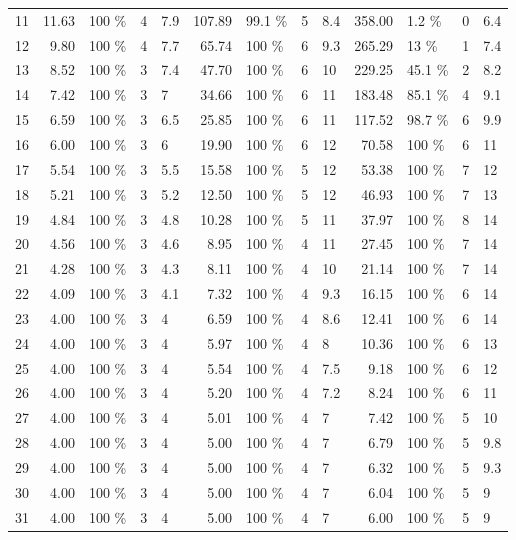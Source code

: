 \begin{tabular}{c|rlll|rlll|rlll}
    11 & 11.63 	&100  \% &     4 &   7.9 &107.89 	&99.1 \% &     5 &   8.4 &358.00 	&1.2  \% &     0 &   6.4\\
    12 &  9.80 	&100  \% &     4 &   7.7 & 65.74 	&100  \% &     6 &   9.3 &265.29 	&13   \% &     1 &   7.4\\
    13 &  8.52 	&100  \% &     3 &   7.4 & 47.70 	&100  \% &     6 &    10 &229.25 	&45.1 \% &     2 &   8.2\\
    14 &  7.42 	&100  \% &     3 &     7 & 34.66 	&100  \% &     6 &    11 &183.48 	&85.1 \% &     4 &   9.1\\
    15 &  6.59 	&100  \% &     3 &   6.5 & 25.85 	&100  \% &     6 &    11 &117.52 	&98.7 \% &     6 &   9.9\\
    16 &  6.00 	&100  \% &     3 &     6 & 19.90 	&100  \% &     6 &    12 & 70.58 	&100  \% &     6 &    11\\
    17 &  5.54 	&100  \% &     3 &   5.5 & 15.58 	&100  \% &     5 &    12 & 53.38 	&100  \% &     7 &    12\\
    18 &  5.21 	&100  \% &     3 &   5.2 & 12.50 	&100  \% &     5 &    12 & 46.93 	&100  \% &     7 &    13\\
    19 &  4.84 	&100  \% &     3 &   4.8 & 10.28 	&100  \% &     5 &    11 & 37.97 	&100  \% &     8 &    14\\
    20 &  4.56 	&100  \% &     3 &   4.6 &  8.95 	&100  \% &     4 &    11 & 27.45 	&100  \% &     7 &    14\\
    21 &  4.28 	&100  \% &     3 &   4.3 &  8.11 	&100  \% &     4 &    10 & 21.14 	&100  \% &     7 &    14\\
    22 &  4.09 	&100  \% &     3 &   4.1 &  7.32 	&100  \% &     4 &   9.3 & 16.15 	&100  \% &     6 &    14\\
    23 &  4.00 	&100  \% &     3 &     4 &  6.59 	&100  \% &     4 &   8.6 & 12.41 	&100  \% &     6 &    14\\
    24 &  4.00 	&100  \% &     3 &     4 &  5.97 	&100  \% &     4 &     8 & 10.36 	&100  \% &     6 &    13\\
    25 &  4.00 	&100  \% &     3 &     4 &  5.54 	&100  \% &     4 &   7.5 &  9.18 	&100  \% &     6 &    12\\
    26 &  4.00 	&100  \% &     3 &     4 &  5.20 	&100  \% &     4 &   7.2 &  8.24 	&100  \% &     6 &    11\\
    27 &  4.00 	&100  \% &     3 &     4 &  5.01 	&100  \% &     4 &     7 &  7.42 	&100  \% &     5 &    10\\
    28 &  4.00 	&100  \% &     3 &     4 &  5.00 	&100  \% &     4 &     7 &  6.79 	&100  \% &     5 &   9.8\\
    29 &  4.00 	&100  \% &     3 &     4 &  5.00 	&100  \% &     4 &     7 &  6.32 	&100  \% &     5 &   9.3\\
    30 &  4.00 	&100  \% &     3 &     4 &  5.00 	&100  \% &     4 &     7 &  6.04 	&100  \% &     5 &     9\\
    31 &  4.00 	&100  \% &     3 &     4 &  5.00 	&100  \% &     4 &     7 &  6.00 	&100  \% &     5 &     9\\
\end{tabular}\par
